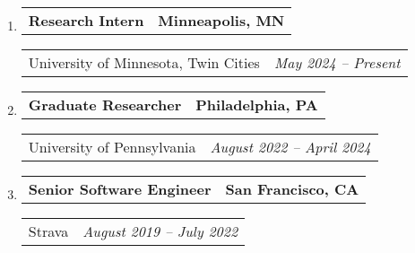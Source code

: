 \documentclass[letterpaper]{article}
\makeatletter
\newif\iflong
\newcommand*{\tabulardef}[3]{\begin{tabular}[t]{@{}lp{\dimexpr\linewidth-#1}@{}}
    #2&#3
\end{tabular}}
\newcommand{\headerrow}[2]
{\begin{tabular*}{\linewidth}{l@{\extracolsep{\fill}}r}
	#1 &
	#2 \\
\end{tabular*}}
\makeatother
\begin{document}
\begin{enumerate}[label=]
	\parskip=-0.05em

	\item
		\headerrow
			{\textbf{Research Intern}}
			{\textbf{Minneapolis, MN}}
	\headerrow
		{University of Minnesota, Twin Cities}
        {\emph{May 2024 -- Present}}
    \iflong
	\begin{enumerate}[label= *]
	\parskip=-0.1em
        \item Study the theoretical foundations of type theory
        \item Build proof assistants or related software components
	\end{enumerate}
    \fi

	\item
		\headerrow
			{\textbf{Graduate Researcher}}
			{\textbf{Philadelphia, PA}}
	\headerrow
        {University of Pennsylvania}
        {\emph{August 2022 -- April 2024}}
    \iflong
	\begin{enumerate}[label= *]
	\parskip=-0.1em
        \item\tabulardef{4cm}{}{Studied the duality of effects and coeffects in call-by-push-value.
            Formalized properties of type-and-effect system in Agda.}
        \item\tabulardef{4cm}{}{Developed a proof by logical relations that can be used for teach
            ing the technique of logical relations with a proof assistant.}
        \item\tabulardef{4cm}{}{Wrote an online tutorial for normalization-by-evaluation (NbE) in
            literate Agda. Formalized correctness of NbE for the simply-typed lambda calculus.}
        \item\tabulardef{4cm}{}{Formalized a type system and semantics for DeFINE, a programming
            language for the network data plane}
	\end{enumerate}
    \fi

	\item
		\headerrow
			{\textbf{Senior Software Engineer}}
			{\textbf{San Francisco, CA}}
	\headerrow
		{Strava}
		{\emph{August 2019 -- July 2022}}
    \iflong
	\begin{enumerate}[label= *]
	\parskip=-0.1em
        \item Led the design and implementation of core system for modeling types of activities
        \item Mentored junior engineers in microservice architecture and Scala programming
		\item Used Apache Spark to build a geospatial data export tool for city planners
		\item Built tools to verify and ensure correctness of internal route data
		\item Developed a Scala microservice to serve all static maps in product
	\end{enumerate}
    \fi
\end{enumerate}
\end{document}
